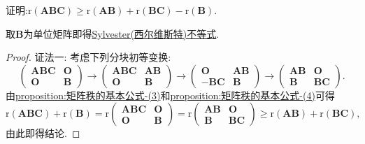 \documentclass[../../main.tex]{subfiles}%
\begin{document}
\begin{proposition}\label{proposition:Frobenius(弗罗贝尼乌斯)不等式}证明:\(\mathrm{r}(\boldsymbol{A}\boldsymbol{B}\boldsymbol{C})\geqslant \mathrm{r}(\boldsymbol{A}\boldsymbol{B})+\mathrm{r}(\boldsymbol{B}\boldsymbol{C})-\mathrm{r}(\boldsymbol{B})\).
\end{proposition}
\begin{remark}
取$\boldsymbol{B}$为单位矩阵即得\hyperref[proposition:Sylvester(西尔维斯特)不等式]{Sylvester(西尔维斯特)不等式}.
\end{remark}
\begin{proof}

{\color{blue}证法一:}
考虑下列分块初等变换:
\[
\begin{pmatrix}
\boldsymbol{A}\boldsymbol{B}\boldsymbol{C}&\boldsymbol{O}\\
\boldsymbol{O}&\boldsymbol{B}
\end{pmatrix}\to
\begin{pmatrix}
\boldsymbol{A}\boldsymbol{B}\boldsymbol{C}&\boldsymbol{A}\boldsymbol{B}\\
\boldsymbol{O}&\boldsymbol{B}
\end{pmatrix}\to
\begin{pmatrix}
\boldsymbol{O}&\boldsymbol{A}\boldsymbol{B}\\
-\boldsymbol{B}\boldsymbol{C}&\boldsymbol{B}
\end{pmatrix}\to
\begin{pmatrix}
\boldsymbol{A}\boldsymbol{B}&\boldsymbol{O}\\
\boldsymbol{B}&\boldsymbol{B}\boldsymbol{C}
\end{pmatrix}.
\]
由\hyperref[proposition:矩阵秩的基本公式-3]{proposition:矩阵秩的基本公式-(3)}和\hyperref[proposition:矩阵秩的基本公式-4]{proposition:矩阵秩的基本公式-(4)}可得
\[
\mathrm{r}(\boldsymbol{A}\boldsymbol{B}\boldsymbol{C})+\mathrm{r}(\boldsymbol{B})=\mathrm{r}\begin{pmatrix}
\boldsymbol{A}\boldsymbol{B}\boldsymbol{C}&\boldsymbol{O}\\
\boldsymbol{O}&\boldsymbol{B}
\end{pmatrix}=\mathrm{r}\begin{pmatrix}
\boldsymbol{A}\boldsymbol{B}&\boldsymbol{O}\\
\boldsymbol{B}&\boldsymbol{B}\boldsymbol{C}
\end{pmatrix}\geqslant \mathrm{r}(\boldsymbol{A}\boldsymbol{B})+\mathrm{r}(\boldsymbol{B}\boldsymbol{C}),
\]
由此即得结论. 


\end{proof}
\end{document}

